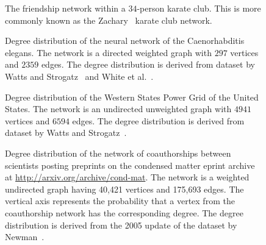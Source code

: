 \begin{figure}[!htbp]
\centering
{}

\caption{The friendship network within a $34$-person karate club. This
  is more commonly known as the Zachary~\cite{Zachary1977} karate club
  network.}
\label{fig:random_graphs:Zachary_karate_club}
\end{figure}

\begin{figure}[!htbp]
\centering
{}

\caption{Degree distribution of the neural network of the
  Caenorhabditis elegans. The network is a directed weighted graph
  with $297$ vertices and $2359$ edges. The degree distribution is
  derived from dataset by Watts and Strogatz~\cite{WattsStrogatz1998}
  and White et al.~\cite{WhiteEtAl1986}.}
\label{fig:random_graphs:degree_distribution:neural_network_C_elegans}
\end{figure}

\begin{figure}[!htbp]
\centering
{}

\caption{Degree distribution of the Western States Power Grid of the
  United States. The network is an undirected unweighted graph with
  $4941$ vertices and $6594$ edges. The degree distribution is derived
  from dataset by Watts and Strogatz~\cite{WattsStrogatz1998}.}
\label{fig:random_graphs:degree_distribution:power_grid}
\end{figure}

\begin{figure}[!htbp]
\centering
{}

\caption{Degree distribution of the network of coauthorships between
  scientists posting preprints on the condensed matter eprint archive
  at \url{http://arxiv.org/archive/cond-mat}. The network is a
  weighted undirected graph having 40,421 vertices and 175,693
  edges. The vertical axis represents the probability that a vertex
  from the coauthorship network has the corresponding degree. The
  degree distribution is derived from the 2005 update of the dataset
  by Newman~\cite{Newman2001b}.}
\label{fig:random_graphs:degree_distribution:condensed_matter_collaboration}
\end{figure}

